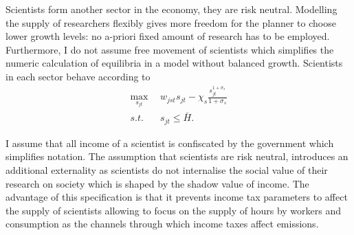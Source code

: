 Scientists form another sector in the economy, they are risk neutral. Modelling the supply of researchers flexibly gives more freedom for the planner to choose lower growth levels: no a-priori fixed amount of research has to be employed. Furthermore, I do not assume free movement of scientists which simplifies the numeric calculation of equilibria in a model without balanced growth. 
Scientists in each sector behave according to 
\begin{align}
\underset{s_{jt}}{\max}\ \ & w_{jst}s_{jt}-\chi_s \frac{s_{jt}^{1+\sigma_s}}{1+\sigma_s}\\
s.t. \ \ & s_{jt}\leq \bar{H}.
\end{align}

I assume that all income of a scientist is confiscated by the government which simplifies notation. The assumption that scientists are risk neutral, introduces an additional externality as scientists do not internalise the social value of their research on society which is shaped by the shadow value of income. The advantage of this specification is that it prevents income tax parameters to affect the supply of scientists allowing to focus on the supply of hours by workers and consumption as the channels through which income taxes affect emissions. 
\begin{comment}
\paragraph{Impossibility of reaching target in laissez-faire with exogenous growth}
\tr{Note that this is wrong! There is an option for the gov to affect inflation which then redirects demand.}
Note that with exogenous growth in each sector there is no possibility for the government to stop emissions from growing, since production of the dirty good is essential for the consumption good (no perfect substitution: $\varepsilon<\infty$). To meet the emission target, the government either needs to affect the growth rate in the economy; i.e., $\upsilon_j$ is a choice variable, or work and consumption need to be set to zero; or the emission target has to be defined in relative terms. The latter possibility contradicts the Paris Agreement which is concerned with absolute emissions.  
I therefore assume, that the government can change the growth rate.

The government chooses the growth rate in each sector, taking into account that research is constrained by an exogenous  amount of scientists
\begin{align}
\upsilon_{ct}+\upsilon_{dt}\leq\Upsilon
\end{align}
\end{comment} 
  
